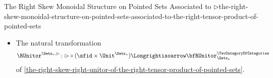 \begin{proposition}{The Right Skew Monoidal Structure on Pointed Sets Associated to $\rhd$}{the-right-skew-monoidal-structure-on-pointed-sets-associated-to-the-right-tensor-product-of-pointed-sets}
\begin{itemize}
            \[
                \LUnitor^{\Sets_{*},\rhd}%
                \colon%
                \bfLUnitor^{\TwoCategoryOfCategories}_{\Sets_{*}}
                \Longrightisoarrow
                {\rhd}\circ{(\Unit^{\Sets_{*}}\times\id_{\Sets_{*}})}
            \]
            of \cref{the-right-skew-left-unitor-of-the-right-tensor-product-of-pointed-sets}.
        \item{}The natural transformation
            \[
                \RUnitor^{\Sets_{*},\rhd}%
                \colon%
                {\rhd}\circ{({\sfid}\times{\Unit^{\Sets_{*}}})}%
                \Longrightisoarrow%
                \bfRUnitor^{\TwoCategoryOfCategories}_{\Sets_{*}}%
            \]
            of \cref{the-right-skew-right-unitor-of-the-right-tensor-product-of-pointed-sets}.
    \end{itemize}
\end{proposition}

